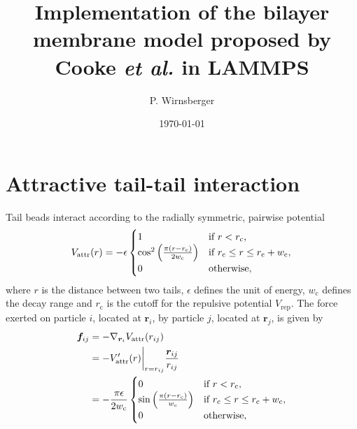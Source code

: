 \documentclass[aip,jcp,reprint,floatfix,a4paper]{revtex4-1}  %
\begin{document}
\title[]{Implementation of the bilayer membrane model proposed by Cooke \textit{et al.} in LAMMPS}

\author{P. Wirnsberger}

\date{\today}
\maketitle


\section{\label{sec:vattr}Attractive tail-tail interaction}
Tail beads interact according to the radially symmetric, pairwise potential
\begin{equation}
V_\text{attr}(r) = -\epsilon  
  \begin{cases}   
     1                                                                   &  \mbox{if $ r < r_\text{c}$,} \\
     \cos^2\left(\frac{\pi (r-r_\text{c})}{2 w_\text{c}} \right)           &  \mbox{if $ r_\text{c} \leq r \leq r_\text{c} + w_\text{c}$,} \\
     0                                                                   &  \mbox {otherwise},
  \end{cases}
\end{equation}
where $r$ is the distance between two tails, $\epsilon$ defines the unit of energy, 
$w_\text{c}$ defines the decay range and $r_\text{c}$ is the cutoff for the repulsive potential $V_\text{rep}$.
The force exerted on particle $i$, located at $\mathbold r_i$, by particle $j$, located at $\mathbold r_j$, is given by 
\begin{align}
\mathbold f_{ij} &= -\nabla_{{\mathbold r}_i} V_\text{attr}(r_{ij}) \\
                 &= - V'_\text{attr}(r) \bigg|_{r = r_{ij}} \frac{\mathbold r_{ij}}{r_{ij}}  \\
                 &= -\frac{\pi \epsilon}{2 w_\text{c}}
  \begin{cases}   
     0                                                                   &  \mbox{if $ r < r_\text{c}$,} \\
     \sin\left(\frac{\pi (r-r_\text{c})}{w_\text{c}} \right)             &  \mbox{if $ r_\text{c} \leq r \leq r_\text{c} + w_\text{c}$,} \\
     0                                                                   &  \mbox {otherwise},
  \end{cases}
\end{align}
\end{document}

